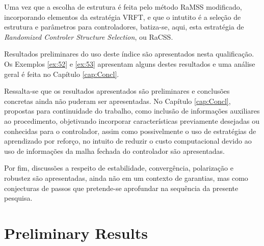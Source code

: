 Uma vez que a escolha de estrutura é feita pelo método RaMSS modificado, incorporando elementos da estratégia VRFT, e que o intutito é a seleção de estrutura e parâmetros para controladores, batiza-se, aqui, esta estratégia de \textit{Randomized Controler Structure Selection}, ou RaCSS.

Resultados preliminares do uso deste índice são apresentados nesta qualificação. Os Exemplos \ref{ex:52} e \ref{ex:53} apresentam alguns destes resultados e uma análise geral é feita no Capítulo \ref{cap:Concl}.  

Ressalta-se que os resultados apresentados são preliminares e conclusões concretas ainda não puderam ser apresentadas. 
No Capítulo \ref{cap:Concl}, propostas para continuidade do trabalho, como inclusão de informações auxiliares ao procedimento, objetivando incorporar características previamente desejadas ou conhecidas para o controlador, assim como possivelmente o uso de estratégias de aprendizado por reforço, no intuito de reduzir o custo computacional devido ao uso de informações da malha fechada do controlador são apresentadas.

Por fim, discussões a respeito de estabilidade, convergência, polarização e robustez são apresentadas, ainda não em um contexto de garantias, mas como conjecturas de passos que pretende-se aprofundar na sequência da presente pesquisa.

\section{Preliminary Results}\label{sec:prel_results}

